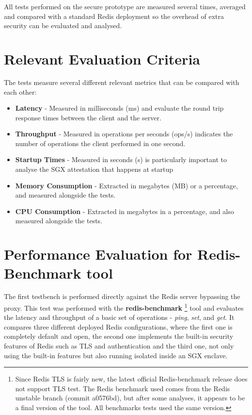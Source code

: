 All tests performed on the secure prototype are measured several times, averaged and compared with a standard Redis deployment so the overhead of extra security can be evaluated and analysed. 

\section{Relevant Evaluation Criteria}
\label{sec:revelant_evaluation_criteria}

The tests measure several different relevant metrics that can be compared with each other: 

\begin{itemize}
  \item \textbf{Latency} - Measured in milliseconds (ms) and evaluate the round trip response times between the client and the server.
  \item \textbf{Throughput} - Measured in operations per seconds (ops/s) indicates the number of operations the client performed in one second.
  \item \textbf{Startup Times} - Measured in seconds (s) is particularly important to analyse the \gls{SGX} attestation that happens at startup
  \item \textbf{Memory Consumption} - Extracted in megabytes (MB) or a percentage, and measured alongside the tests.
  \item \textbf{\gls{CPU} Consumption} - Extracted in megabytes in a percentage, and also measured alongside the tests.
\end{itemize}

\section{Performance Evaluation for Redis-Benchmark tool}
\label{sec:performance_evaluation_redis_benchmark_tool}

The first testbench is performed directly against the Redis server bypassing the proxy. This test was performed with the \textbf{redis-benchmark} \footnote{Since Redis TLS is fairly new, the latest official Redis-benchmark release does not support TLS test. The Redis benchmark used comes from the Redis unstable branch (commit a0576bd), but after some analyses, it appears to be a final version of the tool. All benchmarks tests used the same version.} tool and evaluates the latency and throughput of a basic set of operations - \textit{ping}, \textit{set}, and \textit{get}. It compares three different deployed Redis configurations, where the first one is completely default and open, the second one implements the built-in security features of Redis such as \gls{TLS} and authentication and the third one, not only using the built-in features but also running isolated inside an \gls{SGX} enclave.

